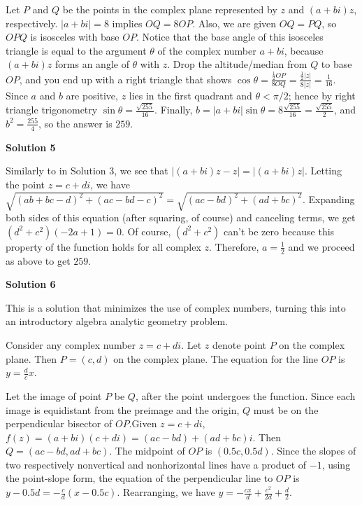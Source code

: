 \begin{enumerate}
Let $P$ and $Q$ be the points in the complex plane represented by $z$ and $(a+bi)z$, respectively.  $|a+bi| = 8$ implies $OQ = 8OP$.  Also, we are given $OQ = PQ$, so $OPQ$ is isosceles with base $OP$.  Notice that the base angle of this isosceles triangle is equal to the argument $\theta$ of the complex number $a + bi$, because $(a+bi)z$ forms an angle of $\theta$ with $z$.  Drop the altitude/median from $Q$ to base $OP$, and you end up with a right triangle that shows $\cos \theta = \frac{\frac{1}{2}OP}{8OQ} = \frac{\frac{1}{2}|z|}{8|z|} = \frac{1}{16}$.  Since $a$ and $b$ are positive, $z$ lies in the first quadrant and $\theta < \pi/2$; hence by right triangle trigonometry $\sin \theta = \frac{\sqrt{255}}{16}$.  Finally, $b = |a+bi|\sin\theta = 8\frac{\sqrt{255}}{16} = \frac{\sqrt{255}}{2}$, and $b^2 = \frac{255}{4}$, so the answer is $259$.

 



\textbf{Solution 5}

Similarly to in Solution 3, we see that $|(a + bi)z - z| = |(a + bi)z|$. Letting the point $z = c + di$, we have $\sqrt{(ab+bc-d)^2+(ac-bd-c)^2} = \sqrt{(ac-bd)^2+(ad+bc)^2}$. Expanding both sides of this equation (after squaring, of course) and canceling terms, we get $(d^2+c^2)(-2a+1) = 0$. Of course, $(d^2+c^2)$ can't be zero because this property of the function holds for all complex $z$. Therefore, $a = \frac{1}{2}$ and we proceed as above to get $\boxed{259}$.

 



\textbf{Solution 6}

This is a solution that minimizes the use of complex numbers, turning this into an introductory algebra analytic geometry problem.

 Consider any complex number $z=c+di$. Let $z$ denote point $P$ on the complex plane. Then $P=(c,d)$ on the complex plane. The equation for the line $OP$ is $y=\frac{d}{c}x$.

 Let the image of point $P$ be $Q$, after the point undergoes the function. Since each image is equidistant from the preimage and the origin, $Q$ must be on the perpendicular bisector of $OP$.Given $z=c+di$, $f(z)=(a+bi)(c+di)=(ac-bd)+(ad+bc)i$. Then $Q=(ac-bd,ad+bc)$. The midpoint of $OP$ is $(0.5c, 0.5d)$. Since the slopes of two respectively nonvertical and nonhorizontal lines have a product of $-1$, using the point-slope form, the equation of the perpendicular line to $OP$ is $y-0.5d=-\frac{c}{d}(x-0.5c)$. Rearranging, we have $y=-\frac{cx}{d}+\frac{c^2}{2d}+\frac{d}{2}$.


\end{enumerate}
